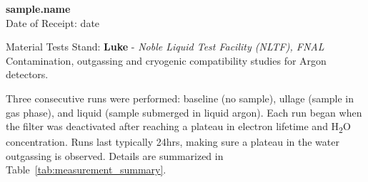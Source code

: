 \documentclass[12pt]{article}
\begin{document}
\begin{center}
    \LARGE \textbf{ {{ sample.name }} } \\
    \large Date of Receipt: {{ date }}
\end{center}

\begin{center}
    \large Material Tests Stand: \textbf{Luke} - \textit{Noble Liquid Test Facility (NLTF), FNAL} \\
    \small Contamination, outgassing and cryogenic compatibility studies for Argon detectors.
\end{center}


\begin{table}[H]
    \centering
    \caption*{\textbf{Sample Information}}
\end{table}

Three consecutive runs were performed: baseline (no sample), ullage (sample in gas phase), and liquid (sample submerged in liquid argon). Each run began when the filter was deactivated after reaching a plateau in electron lifetime and H\textsubscript{2}O concentration. Runs last typically 24hrs, making sure a plateau in the water outgassing is observed. Details are summarized in Table~\ref{tab:measurement_summary}.
\end{document}
